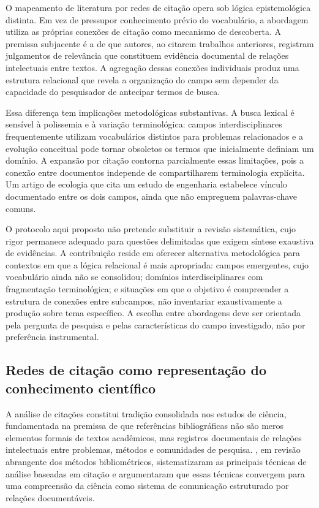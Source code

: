 \documentclass[portuguese]{textolivre}
\begin{document}
	O mapeamento de literatura por redes de citação opera sob lógica epistemológica distinta. Em vez de pressupor conhecimento prévio do vocabulário, a abordagem utiliza as próprias conexões de citação como mecanismo de descoberta. A premissa subjacente é a de que autores, ao citarem trabalhos anteriores, registram julgamentos de relevância que constituem evidência documental de relações intelectuais entre textos. A agregação dessas conexões individuais produz uma estrutura relacional que revela a organização do campo sem depender da capacidade do pesquisador de antecipar termos de busca.
    
	Essa diferença tem implicações metodológicas substantivas. A busca lexical é sensível à polissemia e à variação terminológica: campos interdisciplinares frequentemente utilizam vocabulários distintos para problemas relacionados e a evolução conceitual pode tornar obsoletos os termos que inicialmente definiam um domínio. A expansão por citação contorna parcialmente essas limitações, pois a conexão entre documentos independe de compartilharem terminologia explícita. Um artigo de ecologia que cita um estudo de engenharia estabelece vínculo documentado entre os dois campos, ainda que não empreguem palavras-chave comuns.
    
	O protocolo aqui proposto não pretende substituir a revisão sistemática, cujo rigor permanece adequado para questões delimitadas que exigem síntese exaustiva de evidências. A contribuição reside em oferecer alternativa metodológica para contextos em que a lógica relacional é mais apropriada: campos emergentes, cujo vocabulário ainda não se consolidou; domínios interdisciplinares com fragmentação terminológica; e situações em que o objetivo é compreender a estrutura de conexões entre subcampos, não inventariar exaustivamente a produção sobre tema específico. A escolha entre abordagens deve ser orientada pela pergunta de pesquisa e pelas características do campo investigado, não por preferência instrumental.


\subsection{Redes de citação como representação do conhecimento científico}\label{sec-fmt-manuscrito}
A análise de citações constitui tradição consolidada nos estudos de ciência, fundamentada na premissa de que referências bibliográficas não são meros elementos formais de textos acadêmicos, mas registros documentais de relações intelectuais entre problemas, métodos e comunidades de pesquisa. \textcite{Zupic2015}, em revisão abrangente dos métodos bibliométricos, sistematizaram as principais técnicas de análise baseadas em citação e argumentaram que essas técnicas convergem para uma compreensão da ciência como sistema de comunicação estruturado por relações documentáveis.
\end{document}

